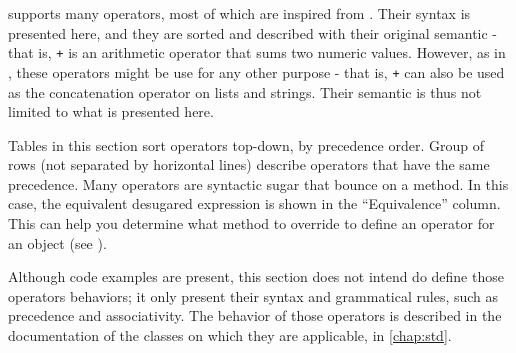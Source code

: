 \documentclass[openright,twoside,12pt]{report}
\begin{document}
\us supports many operators, most of which are inspired from
\Cxx. Their syntax is presented here, and they are sorted and
described with their original semantic - that is, \lstinline|+| is an
arithmetic operator that sums two numeric values. However, as in \Cxx,
these operators might be use for any other purpose - that is,
\lstinline|+| can also be used as the concatenation operator on lists
and strings. Their semantic is thus not limited to what is presented
here.

Tables in this section sort operators top-down, by precedence order.
Group of rows (not separated by horizontal lines) describe operators
that have the same precedence. Many operators are syntactic sugar that
bounce on a method. In this case, the equivalent desugared expression
is shown in the ``Equivalence'' column. This can help you determine
what method to override to define an operator for an object (see
).

Although code examples are present, this section does not intend do
define those operators behaviors; it only present their syntax and
grammatical rules, such as precedence and associativity. The behavior
of those operators is described in the documentation of the classes on
which they are applicable, in \autoref{chap:std}.

\newcommand{\operatorhead}{Operator & Use & Associativity & Original semantic
  & Equivalence\\}


\newcommand{\operator}[6][ ]{\lstinline@#2@&\lstinline@#3@&#4&#5&\lstinline@#6@#1\\}
\newcommand{\boperator}[3]{\operator{#1}{a #1 b}{#2}{#3}{a.'#1'(b)}}
\newcommand{\poperator}[3]{\operator{#1}{#1a}{#2}{#3}{a.'#1'()}}

\newcommand{\operatordot}    {\operator  {.}    {a.b}              {-}     {Message sending}          {Not redefinable}       }
\newcommand{\operatordota}   {\operator  {.}    {a.b(args)}        {-}     {Message sending}          {Not redefinable}       }
\newcommand{\operatorsub}    {\operator  {[]}   {a[args]}          {-}     {Subscript}                {a.'[]'(args)}          }
\newcommand{\operatorsubass} {\operator  {[] =} {a[args] = v}      {-}     {Subscript assignment}     {a.'[]='(args, v)}      }
\newcommand{\operatorass}[2][ ]    {\operator[#1]
                                         {=}    {a = b}            {Right} {Assignment}               {updateSlot("a", b)}    }

\newcommand{\operatoriass}[1]{\operator  {#1=}  {a #1= b}          {Right} {In place assignment}      {a = a #1 b}            }
\newcommand{\operatorsiass}  {
    \operatoriass{+}
    \operatoriass{-}
    \operatoriass{*}
    \operatoriass{/}
    \operatoriass{\%}
    \operatoriass{\^}
    \operatoriass{\~}
}
\newcommand{\operatorinc}    {\operator  {++}   {a++}              {-}     {Incrementation}           {(a = a + 1) - 1}       }
\newcommand{\operatordec}    {\operator  {--}   {a--}              {-}     {Incrementation}           {(a = a - 1) + 1}       }
\end{document}

